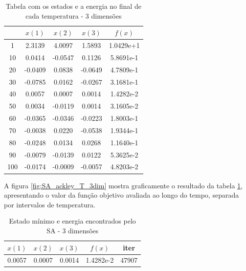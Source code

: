 \documentclass[conference,compsoc]{IEEEtran}
\begin{document}
\begin{table}[!htcb]
  \centering
  \begin{tabular}{|c|c|c|c|c|}
    \hline
\rowcolor{kugray5}           &     $x(1)$   &       $x(2)$   &   $x(3)$     &     $f(x)$    \\ \hline
\cellcolor{kugray5}1	  &    2.3139	&     4.0097	 &    1.5893	  &    1.0429e+1	\\ \hline
\rowcolor{kugray5}10	  &    0.0414	&     -0.0547	 &    0.1126	  &    5.8691e-1	\\ \hline
\cellcolor{kugray5}20	  &   -0.0409	&     0.0838	 &    -0.0649	  &    4.7809e-1	\\ \hline
\rowcolor{kugray5}30	  &   -0.0785	&     0.0162	 &    -0.0267	  &    3.1681e-1	\\ \hline
\cellcolor{kugray5}40	  &    0.0057	&     0.0007	 &    0.0014	  &    1.4282e-2	\\ \hline
\rowcolor{kugray5}50	  &    0.0034	&     -0.0119	 &    0.0014	  &    3.1605e-2	\\ \hline
\cellcolor{kugray5}60	  &   -0.0365	&     -0.0346	 &    -0.0223	  &    1.8003e-1	\\ \hline
\rowcolor{kugray5}70	  &   -0.0038	&     0.0220	 &    -0.0538	  &    1.9344e-1	\\ \hline
\cellcolor{kugray5}80	  &   -0.0248	&     0.0134	 &    0.0268	  &    1.1640e-1	\\ \hline
\rowcolor{kugray5}90	  &   -0.0079	&     -0.0139	 &    0.0122	  &    5.3625e-2	\\ \hline
\cellcolor{kugray5}100   &   -0.0174	&     -0.0009	 &    -0.0057	  &    4.8203e-2	\\ \hline
	\end{tabular}
  \caption{Tabela com os estados e a energia no final de cada temperatura - 3 dimensões}
  \label{tab:SA_ackley_3dim}
\end{table}

A figura \ref{fig:SA_ackley_T_3dim} mostra graficamente o resultado da tabela \ref{tab:SA_ackley_3dim}, apresentando o valor da função objetivo avaliada ao longo do tempo, separada por intervalos de temperatura.

\begin{table}[!htcb]

  \centering
  \begin{tabular}{|c|c|c|c|c|}
    \hline
    \rowcolor{kugray5}     $x(1)$   &    $x(2)$   &   $x(3)$   &   $f(x)$    &   iter \\ \hline
							0.0057   &   	0.0007	   &   0.0014	   &   1.4282e-2   &   	47907\\ \hline
	\end{tabular}
  \caption{Estado mínimo e energia encontrados pelo SA - 3 dimensões}
  \label{tab:min_SA_3dim}
\end{table}
\end{document}
